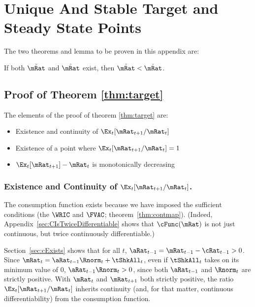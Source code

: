 \documentclass[\econtexRoot/BufferStockTheory]{subfiles}
\begin{document}
\hypertarget{ApndxMTargetIsStable}{}
\section{Unique And Stable Target and Steady State Points}\label{sec:ApndxMTargetIsStable}


The two theorems and lemma to be proven in this appendix are:
\onlyinsubfile{\setcounter{theorem}{1}}



  

  \begin{lemma}
  If both $\check{\mRat}$ and $\hat{\mRat}$ exist, then $\hat{\mRat} < \check{\mRat}$.
  \end{lemma}

  \subsection{Proof of Theorem \ref{thm:target}}
  
  The elements of the proof of theorem \ref{thm:target} are:
\begin{itemize}
\item Existence and continuity of $\Ex_t [{\mRat}_{t+1}/\mRat_t]$
\item Existence of a point where $\Ex_t [{\mRat}_{t+1}/\mRat_t] = 1$
\item $\Ex_t [{\mRat}_{t+1}]-\mRat_{t}$ is monotonically decreasing
\end{itemize}


\subsubsection{Existence and Continuity of $\Ex_t [{\mRat}_{t+1}/\mRat_t]$.}\label{subsubsec:RatExitsCont}
The consumption function exists because we have imposed the sufficient conditions (the $\WRIC$ and $\FVAC$; theorem~\ref{thm:contmap}).  (Indeed, Appendix~\ref{sec:CIsTwiceDifferentiable} shows that $\cFunc(\mRat)$ is not just continuous, but twice continuously differentiable.)

Section~\ref{sec:cExists} shows that for all $t$, $\aRat_{t-1} = {\mRat}_{t-1} -  \cRat_{t-1} > 0$.  Since ${\mRat}_{t}= {\aRat}_{t-1} \Rnorm_{t} + \tShkAll_{t}$, even if $\tShkAll_{t}$ takes on its minimum value of 0, $\aRat_{t-1} \Rnorm_{t} > 0$, since both $\aRat_{t-1}$ and $\Rnorm_{t}$ are strictly positive.  With $\mRat_{t}$ and $\mRat_{t+1}$ both strictly positive, the ratio $\Ex_t [{\mRat}_{t+1}/\mRat_t]$ inherits continuity (and, for that matter, continuous differentiability) from the consumption function.
\end{document}
